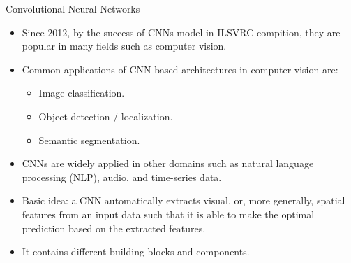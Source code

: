 \begin{vbframe}{Convolutional Neural Networks}
\begin{itemize}
    \item Since 2012, by the success of CNNs model in ILSVRC compition, they are popular in many fields such as computer vision.
    \item Common applications of CNN-based architectures in computer vision are:
    \begin{itemize}
      \item Image classification.
      \item Object detection / localization.
      \item Semantic segmentation.
    \end{itemize}
    \item CNNs are widely applied in other domains such as natural language processing (NLP), audio, and time-series data.
\item Basic idea: a CNN automatically extracts visual, or, more generally, spatial features from an input data such that it is able to make the optimal prediction based on the extracted features.
\item It contains different building blocks and components. 
\end{itemize}
\end{vbframe}


